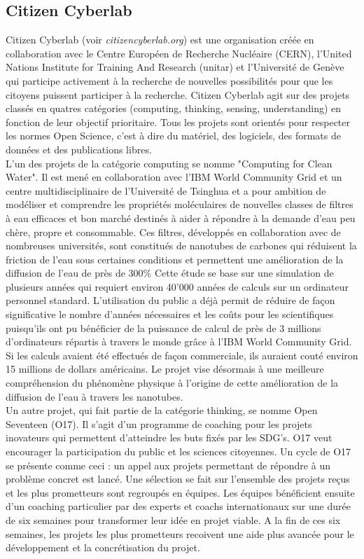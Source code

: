\documentclass[10pt, article]{llncs}
\begin{document}
	\subsection{Citizen Cyberlab}
		Citizen Cyberlab (voir \textit{citizencyberlab.org}) est une organisation créée en collaboration avec le Centre Européen de Recherche Nucléaire (CERN), l'United Nations Institute for Training And Research (unitar) et l'Université de Genève qui participe activement à la recherche de nouvelles possibilités pour que les citoyens puissent participer à la recherche. Citizen Cyberlab agit sur des projets classés en quatres catégories (computing, thinking, sensing, understanding) en fonction de leur objectif prioritaire. Tous les projets sont orientés pour respecter les normes Open Science, c'est à dire du matériel, des logiciels, des formats de données et des publications libres.\\
		L'un des projets de la catégorie computing se nomme "Computing for Clean Water". Il est mené en collaboration avec l'IBM World Community Grid et un centre multidisciplinaire de l'Université de Tsinghua et a pour ambition de modéliser et comprendre les propriétés moléculaires de nouvelles classes de filtres à eau efficaces et bon marché destinés à aider à répondre à la demande d'eau peu chère, propre et consommable. Ces filtres, développés en collaboration avec de nombreuses universités, sont constitués de nanotubes de carbones qui réduisent la friction de l'eau sous certaines conditions et permettent une amélioration de la diffusion de l'eau de près de 300\% Cette étude se base sur une simulation de plusieurs années qui requiert environ 40'000 années de calculs sur un ordinateur personnel standard. L'utilisation du public a déjà permit de réduire de façon significative le nombre d'années nécessaires et les coûts pour les scientifiques puisqu'ils ont pu bénéficier de la puissance de calcul de près de 3 millions d'ordinateurs répartis à travers le monde grâce à l'IBM World Community Grid. Si les calculs avaient été effectués de façon commerciale, ils auraient couté environ 15 millions de dollars américains. Le projet vise désormais à une meilleure compréhension du phénomène physique à l'origine de cette amélioration de la diffusion de l'eau à travers les nanotubes.\\
		Un autre projet, qui fait partie de la catégorie thinking, se nomme Open Seventeen (O17). Il s'agit d'un programme de coaching pour les projets inovateurs qui permettent d'atteindre les buts fixés par les SDG's. O17 veut encourager la participation du public et les sciences citoyennes. Un cycle de O17 se présente comme ceci : un appel aux projets permettant de répondre à un problème concret est lancé. Une sélection se fait sur l'ensemble des projets reçus et les plus prometteurs sont regroupés en équipes. Les équipes bénéficient ensuite d'un coaching particulier par des experts et coachs internationaux sur une durée de six semaines pour transformer leur idée en projet viable. A la fin de ces six semaines, les projets les plus prometteurs recoivent une aide plus avancée pour le développement et la concrétisation du projet.
		
\end{document}
